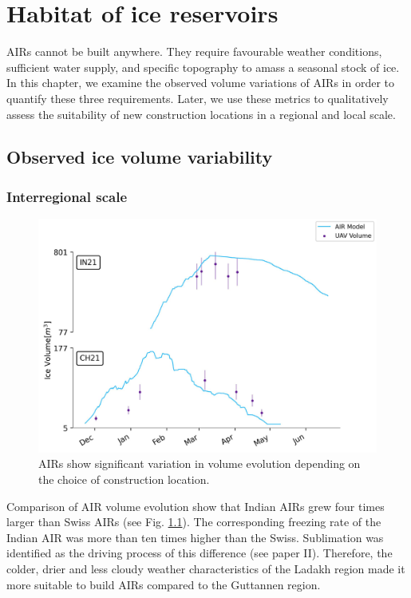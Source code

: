 \chapter{Habitat of ice reservoirs}


AIRs cannot be built anywhere. They require favourable weather conditions, sufficient water supply, and specific
topography to amass a seasonal stock of ice. In this chapter, we examine the observed volume variations of AIRs
in order to quantify these three requirements. Later, we use these metrics to qualitatively assess the
suitability of new construction locations in a regional and local scale.

\section{Observed ice volume variability}

\subsection{Interregional scale}

\begin{figure}[htb]
\centering
\includegraphics[width=12cm]{figs/IN21vsCH21.jpg}
\caption{AIRs show significant variation in volume evolution depending on the choice of construction location.}
\label{fig:2AIRs}
\end{figure}

Comparison of AIR volume evolution show that Indian AIRs grew four times larger than Swiss AIRs (see Fig.
\ref{fig:2AIRs}). The corresponding freezing rate of the Indian AIR was more than ten times higher than the
Swiss. Sublimation was identified as the driving process of this difference (see paper II). Therefore, the
colder, drier and less cloudy weather characteristics of the Ladakh region made it more suitable to build AIRs
compared to the Guttannen region.

